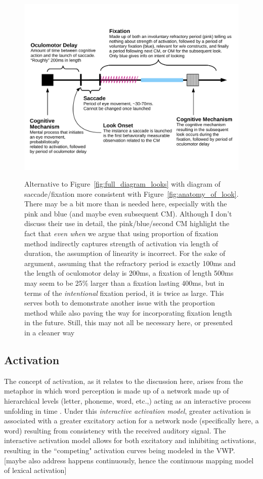 \documentclass{article}
\begin{document}
\begin{figure}
\centering
\includegraphics[scale=0.5]{what_is_a_look.pdf}
\label{fig:whats_in_a_look}
\caption{Alternative to Figure~\ref{fig:full_diagram_looks} with diagram of saccade/fixation more consistent with Figure~\ref{fig:anatomy_of_look}. There may be a bit more than is needed here, especially with the pink and blue (and maybe even subsequent CM). Although I don't discuss their use in detail, the pink/blue/second CM highlight the fact that \textit{even when} we argue that using proportion of fixation method indirectly captures strength of activation via length of duration, the assumption of linearity is incorrect. For the sake of argument, assuming that the refractory period is exactly 100ms and the length of oculomotor delay is 200ms, a fixation of length 500ms may seem to be 25\% larger than a fixation lasting 400ms, but in terms of the \textit{intentional} fixation period, it is twice as large. This serves both to demonstrate another issue with the proportion method while also paving the way for incorporating fixation length in the future. Still, this may not all be necessary here, or presented in a cleaner way} 
\end{figure}

\subsection{Activation}

The concept of activation, as it relates to the discussion here, arises from the metaphor in which word perception is made up of a network made up of hierarchical levels (letter, phoneme, word, etc.,) acting as an interactive process unfolding in time \cite{McClelland1981}. Under this \textit{interactive activation model}, greater activation is associated with a greater excitatory action for a network node (specifically here, a word) resulting from consistency with the received auditory signal. The interactive activation model allows for both excitatory and inhibiting activations, resulting in the ``competing" activation curves being modeled in the VWP. [maybe also address happens continuously, hence the continuous mapping model of lexical activation]
\end{document}
